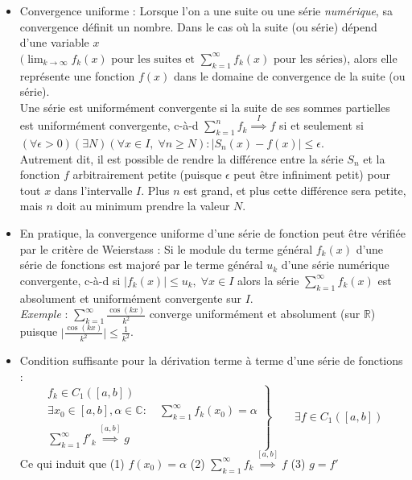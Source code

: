 \documentclass[a4paper]{article}
\begin{document}
\begin{itemize}
\item Convergence uniforme : Lorsque l'on a une suite ou une série \emph{numérique}, sa convergence définit un nombre. Dans le cas où la suite (ou série) dépend d'une variable $ x $ $\displaystyle \Big( \lim_{k \to \infty} f_k(x) \text{ pour les suites et } \sum_{k=1}^{\infty} f_k(x) \text{ pour les séries} \Big) $, alors elle représente une fonction $ f(x) $ dans le domaine de convergence de la suite (ou série). \\
Une série est uniformément convergente si la suite de ses sommes partielles est uniformément convergente, c-à-d $\displaystyle \sum_{k=1}^{n} f_k \overset{I}{\implies} f $ \quad si et seulement si \quad $\displaystyle (\forall \epsilon > 0) (\exists N) (\forall x \in I, \; \forall n \geq N) : | S_n(x) - f(x) | \leq \epsilon $. \\
Autrement dit, il est possible de rendre la différence entre la série $ S_n $ et la fonction $ f $ arbitrairement petite (puisque $ \epsilon $ peut être infiniment petit) pour tout $ x $ dans l'intervalle $ I $. Plus $ n $ est grand, et plus cette différence sera petite, mais $ n $ doit au minimum prendre la valeur $ N $.





\item En pratique, la convergence uniforme d'une série de fonction peut être vérifiée par le critère de Weierstass : Si le module du terme général $ f_k(x) $ d'une série de fonctions est majoré par le terme général $ u_k $ d'une série numérique convergente, c-à-d si \qquad $\displaystyle |f_k(x)| \leq u_k, \; \forall x \in I $ \qquad alors la série \qquad $\displaystyle \sum_{k=1}^{\infty} f_k(x) $ \qquad est absolument et uniformément convergente sur $ I $. \\
\emph{Exemple} : $\displaystyle \sum_{k=1}^{\infty} \frac{\cos(k x)}{k^2} $ converge uniformément et absolument (sur $ \mathbb{R} $) puisque $\displaystyle \Big| \frac{\cos(k x)}{k^2} \Big| \leq \frac{1}{k^2} $.





\item Condition suffisante pour la dérivation terme à terme d'une série de fonctions :
\[
\left.
    \begin{aligned}
        f_k \in C_1([a, b]) \\
        \exists x_0 \in [a, b], \alpha \in \mathbb{C} : \quad \sum_{k=1}^{\infty} f_k(x_0) = \alpha \\
        \sum_{k=1}^{\infty} f'_k \overset{[a, b]}{\implies} g
    \end{aligned}
\right\}
\qquad \exists f \in C_1([a, b])
\]
Ce qui induit que \qquad (1) $ f(x_0) = \alpha $ \qquad (2) $\displaystyle \sum_{k=1}^{\infty} f_k \overset{[a, b]}{\implies} f $ \qquad (3) $ g = f' $







\end{itemize}
\end{document}

